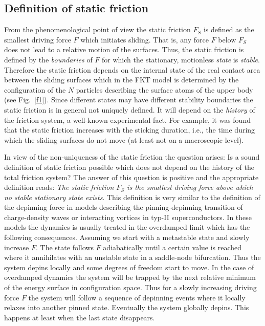 \subsection{\protect\label{STA1}Definition of static friction}

From the phenomenological point of view the static friction $F_S$ is
defined as the smallest driving force $F$ which initiates sliding.
That is, any force $F$ below $F_S$ does not lead to a relative motion
of the surfaces. Thus, the static friction is defined by the {\em
boundaries\/} of $F$ for which the stationary, motionless {\em
state\/} is {\em stable\/}. Therefore the static friction depends on
the internal state of the real contact area between the sliding
surfaces which in the FKT model is determined by the configuration of
the $N$ particles describing the surface atoms of the upper body (see
Fig.~\ref{f1}). Since different states may have different stability
boundaries the static friction is in general not uniquely defined. It
will depend on the {\em history\/} of the friction system, a
well-known experimental fact. For example, it was
found\cite{hes.94,rab.65} that the static friction increases with the
sticking duration, i.e., the time during which the sliding surfaces
do not move (at least not on a macroscopic level).

In view of the non-uniqueness of the static friction the question
arises:  Is a sound definition of static friction possible which does
not depend on the history of the total friction system? The answer of
this question is positive and the appropriate definition reads: {\em
The static friction $F_S$ is the smallest driving force above which
no stable stationary state exists\/}. This definition is very similar
to the definition of the depinning force in models describing the
pinning-depinning transition of charge-density waves or interacting
vortices in typ-II superconductors.  In these models the dynamics is
usually treated in the overdamped limit which has the following
consequences. Assuming we start with a metastable state and
slowly increase $F$. The state follows $F$ adiabatically until a
certain value is reached where it annihilates with an unstable state
in a saddle-node bifurcation. Thus the system depins locally and some
degrees of freedom start to move. In the case of overdamped dynamics
the system will be trapped by the next relative minimum of the energy
surface in configuration space. Thus for a slowly increasing
driving force $F$ the system will follow a sequence of depinning
events where it locally relaxes into another pinned state. 
Eventually the system globally depins. This happens at least when the
last state disappears.


